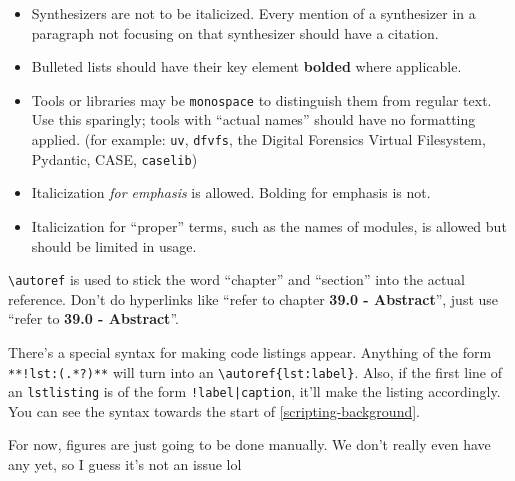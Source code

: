\begin{itemize}
\item
  Synthesizers are not to be italicized. Every mention of a synthesizer
  in a paragraph not focusing on that synthesizer should have a
  citation.
\item
  Bulleted lists should have their key element \textbf{bolded} where
  applicable.
\item
  Tools or libraries may be \passthrough{\lstinline!monospace!} to
  distinguish them from regular text. Use this sparingly; tools with
  ``actual names'' should have no formatting applied. (for example:
  \passthrough{\lstinline!uv!}, \passthrough{\lstinline!dfvfs!}, the
  Digital Forensics Virtual Filesystem, Pydantic, CASE,
  \passthrough{\lstinline!caselib!})
\item
  Italicization \emph{for emphasis} is allowed. Bolding for emphasis is
  not.
\item
  Italicization for ``proper'' terms, such as the names of modules, is
  allowed but should be limited in usage.
\end{itemize}

\passthrough{\lstinline!\\autoref!} is used to stick the word
``chapter'' and ``section'' into the actual reference. Don't do
hyperlinks like ``refer to chapter \textbf{39.0 - Abstract}'', just use
``refer to \textbf{39.0 - Abstract}''.

There's a special syntax for making code listings appear. Anything of
the form \passthrough{\lstinline"**!lst:(.*?)**"} will turn into an
\passthrough{\lstinline!\\autoref\{lst:label\}!}. Also, if the first
line of an \passthrough{\lstinline!lstlisting!} is of the form
\passthrough{\lstinline"!label|caption"}, it'll make the listing
accordingly. You can see the syntax towards the start of \autoref{scripting-background}.

For now, figures are just going to be done manually. We don't really
even have any yet, so I guess it's not an issue lol
